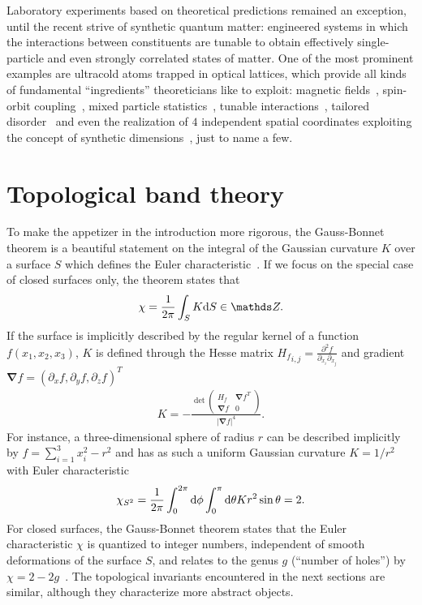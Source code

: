 Laboratory experiments based on theoretical predictions remained an exception, until the recent strive of synthetic quantum matter:
engineered systems in which the interactions between constituents are tunable to obtain effectively single-particle and even strongly correlated states of matter.
One of the most prominent examples are ultracold atoms trapped in optical lattices, which provide all kinds of fundamental ``ingredients'' theoreticians like to exploit: magnetic fields~\cite{Lin2009}, spin-orbit coupling~\cite{Lin2011}, mixed particle statistics~\cite{Ferrari2002}, tunable interactions~\cite{Chin2010}, tailored disorder~\cite{Meier2018} and even the realization of $4$ independent spatial coordinates exploiting the concept of synthetic dimensions~\cite{Lohse2018}, just to name a few.
%
%
\section{Topological band theory}
\label{sec:topological_band_theory}
%
%
To make the appetizer in the introduction more rigorous, the Gauss-Bonnet theorem is a beautiful statement on the integral of the Gaussian curvature $K$ over a surface $S$ which defines the Euler characteristic~\cite{Nakahara1990}.
If we focus on the special case of closed surfaces only, the theorem states that
\begin{align}
    \chi = \frac1{2\pi}\int_S K\rd S\in\mathds Z.
    \label{eq:gauss_bonnet_theorem}
\end{align}
If the surface is implicitly described by the regular kernel of a function $f(x_1,x_2,x_3)$, $K$ is defined through the Hesse matrix ${H_f}_{i,j}=\frac{\partial^2 f}{\partial_{x_i}\partial_{x_j}}$ and gradient $\bm\nabla f = (\partial_{x}f,\partial_{y}f,\partial_{z}f)^T$~\cite{Goldman2005}
\begin{align}
    K = -\frac{
    \det
    \begin{pmatrix}
        H_f & \bm\nabla f^T \\
        \bm\nabla f & 0
    \end{pmatrix}
    }{|\bm\nabla f|^4}
    .
\end{align}
For instance, a three-dimensional sphere of radius $r$ can be described implicitly by $f=\sum_{i=1}^3 x_i^2 - r^2$ and has as such a uniform Gaussian curvature $K=1/r^2$ with Euler characteristic
\begin{align}
    \chi_{S^2} = \frac1{2\pi}\int_0^{2\pi}\mathrm d\phi \int_0^\pi\mathrm d\theta K r^2\sin\theta = 2.
\end{align}
For closed surfaces, the Gauss-Bonnet theorem states that the Euler characteristic $\chi$ is quantized to integer numbers, independent of smooth deformations of the surface $S$, and relates to the genus $g$ (``number of holes'') by $\chi=2-2g$~\cite{Nakahara1990}.
The topological invariants encountered in the next sections are similar, although they characterize more abstract objects.

